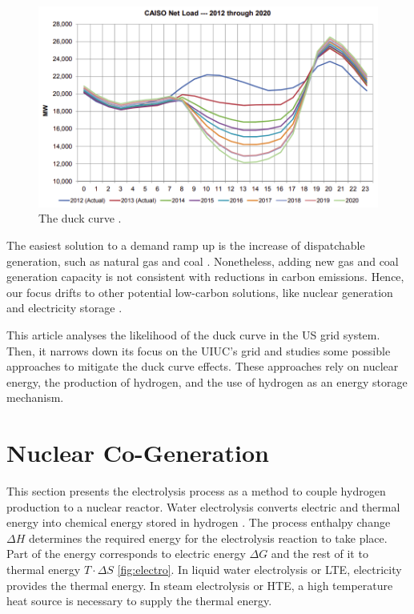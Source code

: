 \documentclass{anstrans}
\begin{document}
\begin{figure}[H]
	\centering
	\includegraphics[width=0.7\linewidth]{figures/caiso-duck.png}
	\hfill
	\caption{The duck curve \cite{bouillon_prepared_2014}.}
	\label{fig:duck}
\end{figure}

The easiest solution to a demand ramp up is the increase of dispatchable generation, such as natural gas and coal \cite{bouillon_prepared_2014}.
Nonetheless, adding new gas and coal generation capacity is not consistent with reductions in carbon emissions.
Hence, our focus drifts to other potential low-carbon solutions, like nuclear generation and electricity storage \cite{ming_resource_2019}.

This article analyses the likelihood of the duck curve in the \gls{US} grid system. Then, it narrows down its focus on the \gls{UIUC}'s grid and studies some possible approaches to mitigate the duck curve effects. These approaches rely on nuclear energy, the production of hydrogen, and the use of hydrogen as an energy storage mechanism. 


\section{Nuclear Co-Generation}
\label{section:hydroprod}

This section presents the electrolysis process as a method to couple hydrogen production to a nuclear reactor.
Water electrolysis converts electric and thermal energy into chemical energy stored in hydrogen \cite{hi2h2_highly_2007}.
The process enthalpy change $\Delta H$ determines the required energy for the electrolysis reaction to take place.
Part of the energy corresponds to electric energy $\Delta G$ and the rest of it to thermal energy $T \cdot \Delta S$ \ref{fig:electro}.
In liquid water electrolysis or \gls{LTE}, electricity provides the thermal energy.
In steam electrolysis or \gls{HTE}, a high temperature heat source is necessary to supply the thermal energy.
\end{document}
